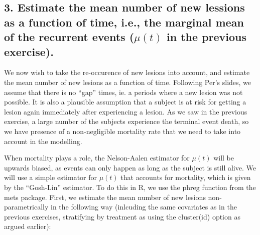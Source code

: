 \documentclass[
  11pt,
]{article}
\begin{document}
\hypertarget{estimate-the-mean-number-of-new-lessions-as-a-function-of-time-i.e.-the-marginal-mean-of-the-recurrent-events-mut-in-the-previous-exercise.}{%
\subsection{\texorpdfstring{3. Estimate the mean number of new lessions
as a function of time, i.e., the marginal mean of the recurrent events
(\(\mu(t)\) in the previous
exercise).}{3. Estimate the mean number of new lessions as a function of time, i.e., the marginal mean of the recurrent events (\textbackslash mu(t) in the previous exercise).}}\label{estimate-the-mean-number-of-new-lessions-as-a-function-of-time-i.e.-the-marginal-mean-of-the-recurrent-events-mut-in-the-previous-exercise.}}

We now wish to take the re-occurence of new lesions into account, and
estimate the mean number of new lesions as a function of time. Following
Per's slides, we assume that there is no ``gap'' times, ie. a periods
where a new lesion was not possible. It is also a plausible assumption
that a subject is at risk for getting a lesion again immediately after
experiencing a lesion. As we saw in the previous exercise, a large
number of the subjects experience the terminal event death, so we have
presence of a non-negligible mortality rate that we need to take into
account in the modelling.

When mortality plays a role, the Nelson-Aalen estimator for \(\mu(t)\)
will be upwards biased, as events can only happen as long as the subject
is still alive. We will use a simple estimator for \(\mu(t)\) that
accounts for mortality, which is given by the ``Gosh-Lin'' estimator. To
do this in R, we use the phreg function from the mets package. First, we
estimate the mean number of new lesions non-parametrically in the
following way (inlcuding the same covariates as in the previous
exercises, stratifying by treatment as using the cluster(id) option as
argued earlier):
\end{document}

